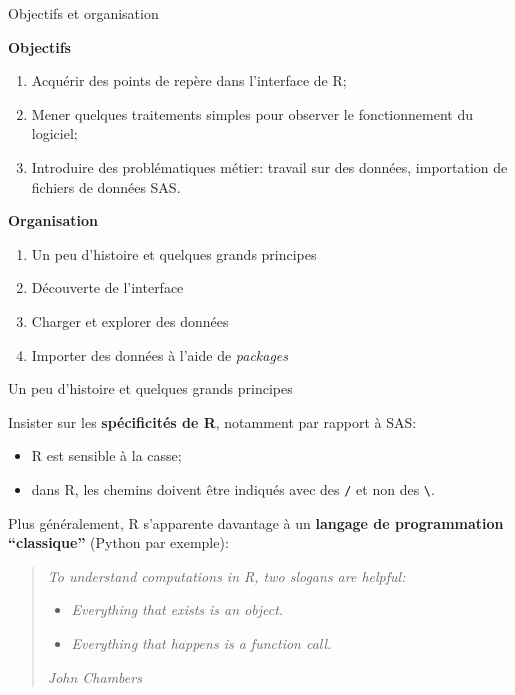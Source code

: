 \documentclass[12pt,ignorenonframetext,]{beamer}
\providecommand{\tightlist}{%
  \setlength{\itemsep}{0pt}\setlength{\parskip}{0pt}}
\newcommand{\strong}[1]{\textbf{\textcolor{redInsee}{#1}}}
\begin{document}
\begin{frame}{Objectifs et organisation}
\protect\hypertarget{objectifs-et-organisation}{}

\strong{Objectifs}

\begin{enumerate}
[1.]
\tightlist
\item
  Acquérir des points de repère dans l’interface de R;
\item
  Mener quelques traitements simples pour observer le fonctionnement du
  logiciel;
\item
  Introduire des problématiques métier: travail sur des données,
  importation de fichiers de données SAS.
\end{enumerate}

\bigskip \pause \strong{Organisation}

\begin{enumerate}
[1.]
\item
  Un peu d’histoire et quelques grands principes
\item
  Découverte de l’interface
\item
  Charger et explorer des données
\item
  Importer des données à l’aide de \emph{packages}
\end{enumerate}

\end{frame}

\begin{frame}[fragile]{\large Un peu d’histoire et quelques grands
principes}
\protect\hypertarget{un-peu-dhistoire-et-quelques-grands-principes}{}

Insister sur les \textbf{spécificités de R}, notamment par rapport à
SAS:

\begin{itemize}
\tightlist
\item
  R est sensible à la casse;
\item
  dans R, les chemins doivent être indiqués avec des \texttt{/} et non
  des \texttt{\textbackslash{}}.
\end{itemize}

\bigskip \pause Plus généralement, R s’apparente davantage à un
\textbf{langage de programmation \enquote{classique}} (Python par
exemple):

\begin{quote}
\emph{To understand computations in R, two slogans are helpful:}

\begin{itemize}
\item
  \emph{Everything that exists is an object.}
\item
  \emph{Everything that happens is a function call.}
\end{itemize}

\emph{John Chambers}
\end{quote}

\end{frame}
\end{document}
